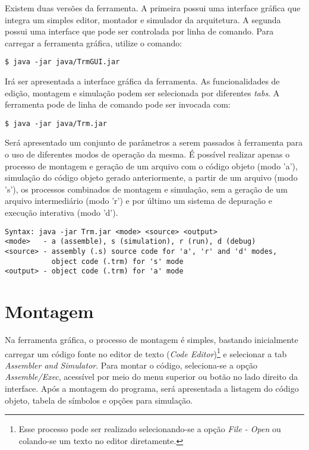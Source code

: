 \documentclass[11pt,a4paper]{report}
\begin{document}
Existem duas versões da ferramenta. A primeira possui uma interface 
gráfica que integra um simples editor, montador e simulador da arquitetura.
A segunda possui uma interface que pode ser controlada por linha de
comando. Para carregar a ferramenta gráfica, utilize o comando:

\begin{verbatim}
$ java -jar java/TrmGUI.jar
\end{verbatim}

Irá ser apresentada a interface gráfica da ferramenta. As funcionalidades
de edição, montagem e simulação podem ser selecionada por diferentes
\textit{tabs}. A ferramenta pode de linha de comando pode ser invocada
com:

\begin{verbatim}
$ java -jar java/Trm.jar
\end{verbatim}

Será apresentado um conjunto de parâmetros a serem passados à ferramenta
para o uso de diferentes modos de operação da mesma. É possível realizar
apenas o processo de montagem e geração de um arquivo com o código objeto
(modo 'a'), simulação do código objeto gerado anteriormente, a partir
de um arquivo (modo 's'), os processos combinados de montagem e simulação,
sem a geração de um arquivo intermediário (modo 'r') e por último um
sistema de depuração e execução interativa (modo 'd').

\begin{verbatim}
Syntax: java -jar Trm.jar <mode> <source> <output>
<mode>   - a (assemble), s (simulation), r (run), d (debug)
<source> - assembly (.s) source code for 'a', 'r' and 'd' modes,
           object code (.trm) for 's' mode
<output> - object code (.trm) for 'a' mode

\end{verbatim}

\section{Montagem}

Na ferramenta gráfica, o processo de montagem é simples, bastando 
inicialmente carregar um código fonte no editor de texto (\textit{Code
Editor})\footnote{Esse processo pode ser realizado selecionando-se a
opção \textit{File - Open} ou colando-se um texto no editor diretamente.}
e selecionar a tab \textit{Assembler and Simulator}. Para montar o código,
seleciona-se a opção \textit{Assemble/Exec}, acessível por meio do menu
superior ou botão no lado direito da interface. Após a montagem do
programa, será apresentada a listagem do código objeto, tabela de 
símbolos e opções para simulação.
\end{document}
